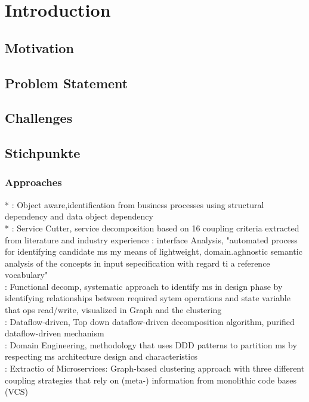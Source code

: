 
\chapter{Introduction}
\label{ch:Introduction}



\section{Motivation}
\label{sec:Introduction:Motivation}

\section{Problem Statement}
\label{sec:Introduction:ProblemStatement}

\section{Challenges}
\label{sec:Introduction:Challenges}



\section{Stichpunkte}

\subsection{Approaches}
* \cite{ObjectAwareAmiri}: Object aware,identification from business processes using structural dependency and data object dependency\\
* \cite{ServiceCutter}: Service Cutter, service decomposition based on 16 coupling criteria extracted from literature and industry experience
\cite{interfaceAnalysisBaresi}: interface Analysis,  "automated process for identifying candidate ms my means of lightweight, domain.aghnostic semantic analysis of the concepts in input sepecification with regard ti a reference vocabulary" \\
\cite{FunctionalDecompositionHeinrich} : Functional decomp, systematic approach to identify ms in design phase by identifying relationships between required sytem operations and state variable that ops read/write, visualized in Graph and the clustering\\
\cite{DataflowDrivenChen}: Dataflow-driven, Top down dataflow-driven decomposition algorithm, purified dataflow-driven mechanism \\
\cite{DomainEngineeringMunezero}: Domain Engineering, methodology that uses DDD patterns to partition ms by respecting ms architecture design and characteristics \\
\cite{ExtractionMazlami}: Extractio of Microservices: Graph-based clustering approach with three different coupling strategies that rely on (meta-) information from monolithic code bases (VCS)

